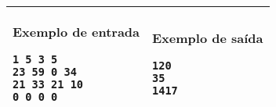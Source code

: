 \begin{table}[!h]
\centering
\begin{tabular}{|l|l|}
\hline
\begin{minipage}[t]{3in}
\textbf{Exemplo de entrada}
\begin{verbatim}
1 5 3 5
23 59 0 34
21 33 21 10
0 0 0 0
\end{verbatim}
\vspace{1mm}
\end{minipage}
&

\begin{minipage}[t]{3in}
\textbf{Exemplo de saída}
\begin{verbatim}
120
35
1417
\end{verbatim}
\vspace{1mm}
\end{minipage} \\
\hline
\end{tabular}
\end{table}

\newpage
